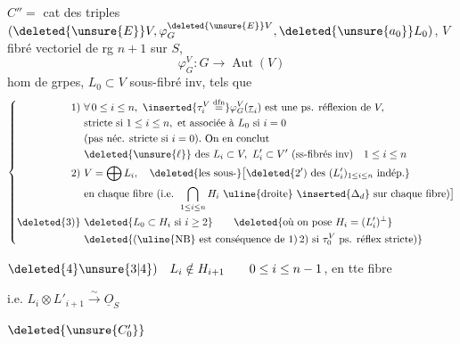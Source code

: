 $\boxed{C''}={}$ cat des triples $(\deleted{\unsure{E}}V,\varphi_G^{\deleted{\unsure{E}}V},\deleted{\unsure{a_0}}L_0)$, $V$ fibré vectoriel de rg $n+1$ sur $S$,
\[
\varphi_G^V:G\longrightarrow\operatorname{Aut}(V)
\]
hom de grpes, $L_0\subset V$ sous-fibré inv, tels que
\[
\left\{\begin{aligned}
1)\ &\forall\,0\leq i\leq n,\ \inserted{\tau_i^V\overset{\mathrm{dfn}}{=}}\varphi_G^V(\underline\tau_i)\text{ est une ps. réflexion de }V,\\
&\text{stricte si }1\leq i\leq n,\text{ et associée à }L_0\text{ si }i=0\\
&\text{(pas néc. stricte si }i=0).\ \text{On en conclut}\\
&\deleted{\unsure{\ell}}\ \text{des }L_i\subset V,\ L'_i\subset V'\ \text{(ss-fibrés inv)}\quad 1\leq i\leq n\\
2)\ &V=\bigoplus L_i,\quad\deleted{\text{les sous-}}\bigl[\deleted{2')\ \text{des }(L'_i)_{1\leq i\leq n}\text{ indép.}}\\
&\text{en chaque fibre (i.e. }\bigcap_{1\leq i\leq n}H_i\ \text{\uline{droite}}\ \inserted{\Delta_d}\ \text{sur chaque fibre)}\bigr]\\
\deleted{3)}\ &\deleted{L_0\subset H_i\ \text{si }i\geq2}\qquad\deleted{\text{où on pose }H_i=(L'_i)^\perp}\\
&\deleted{\text{(\uline{NB} est conséquence de }1)\,2)\text{ si }\tau_0^V\text{ ps. réflex stricte)}}
\end{aligned}\right.
\]


$\deleted{4}\unsure{3|4})\quad L_i\notin H_{i+1}\qquad 0\leq i\leq n-1$, en tte fibre

i.e. $L_i\otimes L'_{i+1}\xrightarrow{\sim}\underline O_S$ 

$\deleted{\unsure{C'_0}}$


